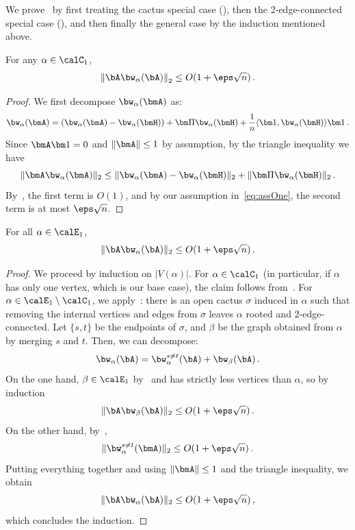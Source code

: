 We prove~ by first treating 
the cactus special case
(), then the 
2-edge-connected special case
(), and then finally the general case by the induction mentioned above.

\begin{lemma}
    \label{lem:AW-cactus}
    For any $\alpha\in\calC_1$,
    \[
        \left\|\bA \bw_\alpha(\bA)\right\|_2\le O(1 + \eps \sqrt n)\,.
    \]
\end{lemma}

\begin{proof}
    We first decompose $\bw_\alpha(\bmA)$ as:
    \[
        \bw_\alpha(\bmA) =  (\bw_\alpha(\bmA) - \bw_\alpha(\bmH)) + \bm \Pi \bw_\alpha(\bmH) + \frac 1n \langle \bm 1, \bw_\alpha(\bmH)\rangle \bm 1\,.
    \]
    Since $\bmA \bm 1 = 0$ and $\|\bmA \|\le 1$
    by assumption, by the triangle inequality we have
    \[
        \|\bmA \bw_\alpha(\bmA)\|_2 \le \|\bw_\alpha(\bmA) - \bw_\alpha(\bmH)\|_2 + \|\bm \Pi \bw_\alpha(\bmH)\|_2\,.
    \]
    By~, the first
    term is $O(1)$, and by our assumption in~\cref{eq:assOne}, the second term is at most $\eps \sqrt n$.
\end{proof}

\begin{lemma}
    \label{lem:AW-2ec}
    For all $\alpha\in\calE_1$,
    \[
        \|\bA \bw_\alpha(\bA)\|_2\le O(1 + \eps \sqrt n)\,.
    \]
\end{lemma}

\begin{proof}
    We proceed by induction on $|V(\alpha)|$.
    For $\alpha\in\calC_1$ (in particular, if $\alpha$ has only one vertex, which is our base case), the claim
    follows from~.
    For $\alpha\in \calE_1\setminus \calC_1$, 
    we apply~: there is an open cactus $\sigma$
    induced in $\alpha$ such that removing the
    internal vertices and edges from $\sigma$
    leaves $\alpha$ rooted and 2-edge-connected.
    Let $\{s,t\}$ be the endpoints of $\sigma$,
    and $\beta$ be the graph obtained from $\alpha$ by merging $s$ and $t$. Then, we
    can decompose:
    \[
        \bw_\alpha(\bA) = \bw_\alpha^{s\neq t}(\bA) + \bw_\beta(\bA)\,.
    \]
    On the one hand, $\beta\in\calE_1$ by~ 
    and has strictly less vertices than $\alpha$,
    so by induction
    \[
        \|\bA \bw_\beta(\bA)\|_2\le O(1 + \eps \sqrt n)\,.
    \]
    On the other hand, by~,
    \[
        \|\bw_\alpha^{s\neq t}(\bmA)\|_2\le O(1 + \eps \sqrt n)\,.
    \]
    Putting everything together and using $\|\bmA\|\le 1$ and the triangle inequality, we obtain
    \[
        \|\bA \bw_\alpha(\bA)\|_2\le O(1 + \eps \sqrt n)\,,
    \]
    which concludes the induction.
\end{proof}

